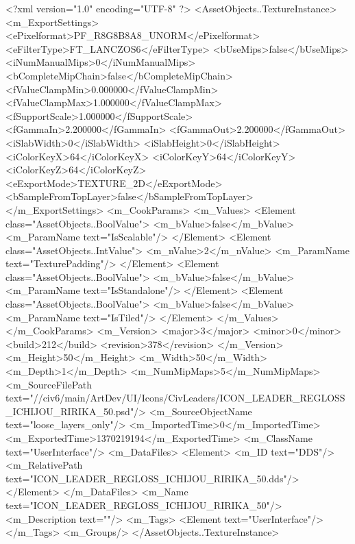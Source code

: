 <?xml version="1.0" encoding="UTF-8" ?>
<AssetObjects..TextureInstance>
	<m_ExportSettings>
		<ePixelformat>PF_R8G8B8A8_UNORM</ePixelformat>
		<eFilterType>FT_LANCZOS6</eFilterType>
		<bUseMips>false</bUseMips>
		<iNumManualMips>0</iNumManualMips>
		<bCompleteMipChain>false</bCompleteMipChain>
		<fValueClampMin>0.000000</fValueClampMin>
		<fValueClampMax>1.000000</fValueClampMax>
		<fSupportScale>1.000000</fSupportScale>
		<fGammaIn>2.200000</fGammaIn>
		<fGammaOut>2.200000</fGammaOut>
		<iSlabWidth>0</iSlabWidth>
		<iSlabHeight>0</iSlabHeight>
		<iColorKeyX>64</iColorKeyX>
		<iColorKeyY>64</iColorKeyY>
		<iColorKeyZ>64</iColorKeyZ>
		<eExportMode>TEXTURE_2D</eExportMode>
		<bSampleFromTopLayer>false</bSampleFromTopLayer>
	</m_ExportSettings>
	<m_CookParams>
		<m_Values>
			<Element class="AssetObjects..BoolValue">
				<m_bValue>false</m_bValue>
				<m_ParamName text="IsScalable"/>
			</Element>
			<Element class="AssetObjects..IntValue">
				<m_nValue>2</m_nValue>
				<m_ParamName text="TexturePadding"/>
			</Element>
			<Element class="AssetObjects..BoolValue">
				<m_bValue>false</m_bValue>
				<m_ParamName text="IsStandalone"/>
			</Element>
			<Element class="AssetObjects..BoolValue">
				<m_bValue>false</m_bValue>
				<m_ParamName text="IsTiled"/>
			</Element>
		</m_Values>
	</m_CookParams>
	<m_Version>
		<major>3</major>
		<minor>0</minor>
		<build>212</build>
		<revision>378</revision>
	</m_Version>
	<m_Height>50</m_Height>
	<m_Width>50</m_Width>
	<m_Depth>1</m_Depth>
	<m_NumMipMaps>5</m_NumMipMaps>
	<m_SourceFilePath text="//civ6/main/ArtDev/UI/Icons/CivLeaders/ICON_LEADER_REGLOSS_ICHIJOU_RIRIKA_50.psd"/>
	<m_SourceObjectName text="loose_layers_only"/>
	<m_ImportedTime>0</m_ImportedTime>
	<m_ExportedTime>1370219194</m_ExportedTime>
	<m_ClassName text="UserInterface"/>
	<m_DataFiles>
		<Element>
			<m_ID text="DDS"/>
			<m_RelativePath text="ICON_LEADER_REGLOSS_ICHIJOU_RIRIKA_50.dds"/>
		</Element>
	</m_DataFiles>
	<m_Name text="ICON_LEADER_REGLOSS_ICHIJOU_RIRIKA_50"/>
	<m_Description text=""/>
	<m_Tags>
		<Element text="UserInterface"/>
	</m_Tags>
	<m_Groups/>
</AssetObjects..TextureInstance>

